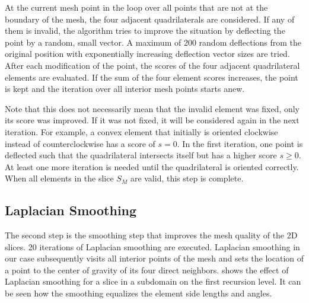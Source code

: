 At the current mesh point in the loop over all points that are not at the boundary of the mesh, the four adjacent quadrilaterals are considered. If any of them is invalid, the algorithm tries to improve the situation by deflecting the point by a random, small vector. A maximum of 200 random deflections from the original position with exponentially increasing deflection vector sizes are tried. After each modification of the point, the scores of the four adjacent quadrilateral elements are evaluated. If the sum of the four element scores increases, the point is kept and the iteration over all interior mesh points starts anew. 

Note that this does not necessarily mean that the invalid element was fixed, only its score was improved. If it was not fixed, it will be considered again in the next iteration. For example, a convex element that initially is oriented clockwise instead of counterclockwise has a score of $s=0$. In the first iteration, one point is deflected such that the quadrilateral intersects itself but has a higher score $s\geq 0$. At least one more iteration is needed until the quadrilateral is oriented correctly.
When all elements in the slice $S_M$ are valid, this step is complete.

\subsection{Laplacian Smoothing}
The second step is the smoothing step that improves the mesh quality of the 2D slices. \num{20} iterations of Laplacian smoothing \cite{field1988laplacianSmoothingAndDelaunayTriangulations} are executed. Laplacian smoothing in our case subsequently visits all interior points of the mesh and sets the location of a point to the center of gravity of its four direct neighbors.
 shows the effect of Laplacian smoothing for a slice in a subdomain on the first recursion level. It can be seen how the smoothing equalizes the element side lengths and angles.

